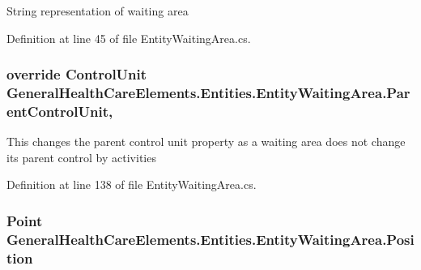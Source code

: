 String representation of waiting area 



Definition at line 45 of file Entity\+Waiting\+Area.\+cs.

\subsubsection[{\texorpdfstring{Parent\+Control\+Unit}{ParentControlUnit}}]{\setlength{\rightskip}{0pt plus 5cm}override {\bf Control\+Unit} General\+Health\+Care\+Elements.\+Entities.\+Entity\+Waiting\+Area.\+Parent\+Control\+Unit\hspace{0.3cm}{\ttfamily [get]}, {\ttfamily [set]}}\hypertarget{class_general_health_care_elements_1_1_entities_1_1_entity_waiting_area_ac6367fade46ede36bf515c1f3bcbe514}{}\label{class_general_health_care_elements_1_1_entities_1_1_entity_waiting_area_ac6367fade46ede36bf515c1f3bcbe514}


This changes the parent control unit property as a waiting area does not change its parent control by activities 



Definition at line 138 of file Entity\+Waiting\+Area.\+cs.

\subsubsection[{\texorpdfstring{Position}{Position}}]{\setlength{\rightskip}{0pt plus 5cm}Point General\+Health\+Care\+Elements.\+Entities.\+Entity\+Waiting\+Area.\+Position\hspace{0.3cm}{\ttfamily [get]}}\hypertarget{class_general_health_care_elements_1_1_entities_1_1_entity_waiting_area_a0443a94e9b145288b9d7e9034513d9a3}{}\label{class_general_health_care_elements_1_1_entities_1_1_entity_waiting_area_a0443a94e9b145288b9d7e9034513d9a3}


